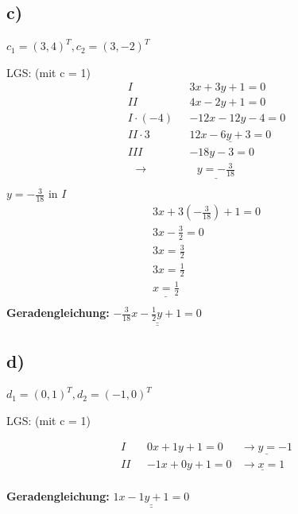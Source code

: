 \documentclass{article}
\begin{document}
\subsection*{c)}
$c_1 = (3,4)^T, c_2 = (3,-2)^T$

LGS: (mit c = 1)
\begin{align*}
    I \ \ \ & 3x + 3y + 1 = 0 \\
    II \ \ \ & 4x - 2y + 1 = 0 \\
    I \cdot (-4) \ \ \ & -12x - 12y - 4 = 0\\
    II \cdot 3 \ \ \ & \underline{ 12x - 6y + 3= 0} \\
    III \ \ \ & -18y - 3 = 0 \\
    \ \ \ \rightarrow & \ \ \ \underline{y = -\frac{3}{18}} \\
\end{align*}
$y = -\frac{3}{18}$ in $I$
\begin{align*}
    3x + 3(-\frac{3}{18}) + 1 = 0 \\
    3x - \frac{3}{2} = 0 \\
    3x = \frac{3}{2}\\
    3x = \frac{1}{2}\\
    \underline{x = \frac{1}{2}} \\
\end{align*}
\textbf{Geradengleichung:} $\underline{\underline{-\frac{3}{18}x - \frac{1}{2}y + 1 = 0}}$

\subsection*{d)}
$d_1 = (0,1)^T, d_2 = (-1,0)^T$

LGS: (mit c = 1)

\begin{align*}
    I \ \ \ & 0x + 1y + 1 = 0 & \underline{\rightarrow y = -1} \\
    II \ \ \ & -1x + 0y + 1 = 0 & \underline{\rightarrow x = 1} \\
\end{align*}

\textbf{Geradengleichung:} $\underline{\underline{1x - 1y + 1 = 0}}$
\end{document}
